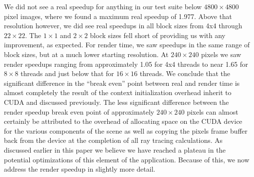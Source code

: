 \documentclass[12pt]{article}
\begin{document}
We did not see a real speedup for anything in our test suite below $4800 \times 4800$ pixel images, where we found a maximum real speedup of 1.977. Above that resolution however, we did see real speedups in all block sizes from 4x4 through $22 \times 22$. The $1 \times 1$ and $2 \times 2$ block sizes fell short of providing us with any improvement, as expected. For render time, we saw speedups in the same range of block sizes, but at a much lower starting resolution. At $240 \times 240$ pixels we saw render speedups ranging from approximately 1.05 for 4x4 threads to near 1.65 for $8 \times 8$ threads and just below that for $16 \times 16$ threads. We conclude that the significant difference in the ``break even'' point between real and render time is almost completely the result of the context initialization overhead inherit to CUDA and discussed previously. The less significant difference between the render speedup break even point of approximately $240 \times 240$ pixels can almost certainly be attributed to the overhead of allocating space on the CUDA device for the various components of the scene as well as copying the pixels frame buffer back from the device at the completion of all ray tracing calculations. As discussed earlier in this paper we believe we have reached a plateau in the potential optimizations of this element of the application. Because of this, we now address the render speedup in slightly more detail.
\end{document}
